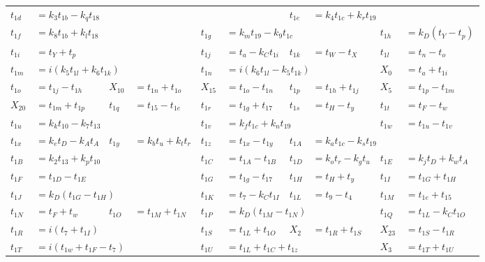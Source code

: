 \begin{tabular}{|p{4.3pt}l|p{4.3pt}l|p{4.3pt}l|p{4.3pt}l|p{4.3pt}l|}
$t_{1d} $ &\multicolumn{5}{l|}{$= k_3t_{1b} - k_qt_{18}$} & $t_{1e} $ &\multicolumn{3}{l|}{$= k_4t_{1c} + k_rt_{19}$}\\ 
$t_{1f} $ &\multicolumn{3}{l|}{$= k_8t_{1b} + k_lt_{18}$} & $t_{1g} $ &\multicolumn{3}{l|}{$= k_mt_{19} - k_9t_{1c}$} & $t_{1h} $ &$= k_D(t_Y - t_p)$\\ 
$t_{1i} $ &\multicolumn{3}{l|}{$= t_Y + t_p$} & $t_{1j} $ &$= t_a - k_Ct_{1i}$ & $t_{1k} $ &$= t_W - t_X$ & $t_{1l} $ &$= t_n - t_o$\\ 
$t_{1m} $ &\multicolumn{3}{l|}{$= i(k_5t_{1l} + k_6t_{1k})$} & $t_{1n} $ &\multicolumn{3}{l|}{$= i(k_6t_{1l} - k_5t_{1k})$} & $X_0 $ &$= t_a + t_{1i}$\\ 
$t_{1o} $ &$= t_{1j} - t_{1h}$ & $X_{10} $ &$= t_{1n} + t_{1o}$ & $X_{15} $ &$= t_{1o} - t_{1n}$ & $t_{1p} $ &$= t_{1h} + t_{1j}$ & $X_5 $ &$= t_{1p} - t_{1m}$\\ 
$X_{20} $ &$= t_{1m} + t_{1p}$ & $t_{1q} $ &$= t_{15} - t_{1e}$ & $t_{1r} $ &$= t_{1g} + t_{17}$ & $t_{1s} $ &$= t_H - t_y$ & $t_{1t} $ &$= t_F - t_w$\\ 
$t_{1u} $ &\multicolumn{3}{l|}{$= k_kt_{10} - k_7t_{13}$} & $t_{1v} $ &\multicolumn{3}{l|}{$= k_ft_{1c} + k_nt_{19}$} & $t_{1w} $ &$= t_{1u} - t_{1v}$\\ 
$t_{1x} $ &$= k_et_D - k_At_A$ & $t_{1y} $ &$= k_bt_u + k_tt_r$ & $t_{1z} $ &$= t_{1x} - t_{1y}$ & $t_{1A} $ &\multicolumn{3}{l|}{$= k_at_{1c} - k_st_{19}$}\\ 
$t_{1B} $ &\multicolumn{3}{l|}{$= k_2t_{13} + k_pt_{10}$} & $t_{1C} $ &$= t_{1A} - t_{1B}$ & $t_{1D} $ &$= k_ot_r - k_gt_u$ & $t_{1E} $ &$= k_jt_D + k_wt_A$\\ 
$t_{1F} $ &\multicolumn{3}{l|}{$= t_{1D} - t_{1E}$} & $t_{1G} $ &$= t_{1g} - t_{17}$ & $t_{1H} $ &$= t_H + t_y$ & $t_{1I} $ &$= t_{1G} + t_{1H}$\\ 
$t_{1J} $ &\multicolumn{3}{l|}{$= k_D(t_{1G} - t_{1H})$} & $t_{1K} $ &$= t_7 - k_Ct_{1I}$ & $t_{1L} $ &$= t_9 - t_4$ & $t_{1M} $ &$= t_{1e} + t_{15}$\\ 
$t_{1N} $ &$= t_F + t_w$ & $t_{1O} $ &$= t_{1M} + t_{1N}$ & $t_{1P} $ &\multicolumn{3}{l|}{$= k_D(t_{1M} - t_{1N})$} & $t_{1Q} $ &$= t_{1L} - k_Ct_{1O}$\\ 
$t_{1R} $ &\multicolumn{3}{l|}{$= i(t_7 + t_{1I})$} & $t_{1S} $ &$= t_{1L} + t_{1O}$ & $X_2 $ &$= t_{1R} + t_{1S}$ & $X_{23} $ &$= t_{1S} - t_{1R}$\\ 
$t_{1T} $ &\multicolumn{3}{l|}{$= i(t_{1w} + t_{1F} - t_7)$} & $t_{1U} $ &\multicolumn{3}{l|}{$= t_{1L} + t_{1C} + t_{1z}$} & $X_3 $ &$= t_{1T} + t_{1U}$\\ 

\end{tabular}
